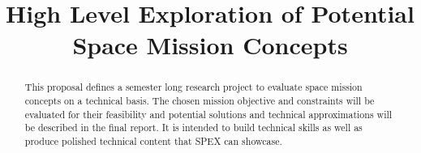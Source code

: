 \documentclass[conference]{IEEEtran} %
\title{High Level Exploration of Potential Space Mission Concepts}
\author{
  \IEEEauthorblockN{%
    T.J.~Tarazevits\IEEEauthorrefmark{1},
    Eric Gerstner\IEEEauthorrefmark{2},
  }
  \IEEEauthorblockA{%
    RIT Space Exploration, Rochester Institute of Technology \\ %
    Rochester, N.Y. \\
    Email:
    \IEEEauthorrefmark{1}tjt3085@rit.edu,
    \IEEEauthorrefmark{2}egg2711@rit.edu,
  }

}
\begin{document}
\maketitle%

\begin{abstract}
This proposal defines a semester long research project to evaluate space mission concepts on a technical basis.
The chosen mission objective and constraints will be evaluated for their feasibility and potential solutions and technical approximations will be described in the final report.
It is intended to build technical skills as well as produce polished technical content that SPEX can showcase.

\end{abstract}

\label{sec:nomenclature}
\newcommand{\nomunit}[1]{%
\renewcommand{\nomentryend}{\hspace*{\fill}#1}}
\renewcommand{\nompreamble}{

  }
\printnomenclature{}
\end{document}
